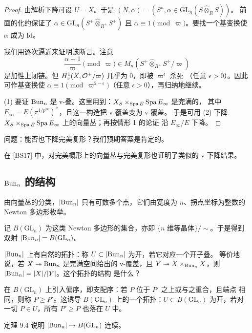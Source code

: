 \begin{proof}
由解析下降可设 $U=X$。于是 $(N,\alpha)=(S^n,\alpha\in\mathrm{GL}_n(S\widehat\otimes_R S))$。
前面的化约保证了 $\alpha\in\mathrm{GL}_n(S^+\widehat\otimes_{R^+}S^+)$ 且
$\alpha\equiv1\pmod\varpi$。要找一个基变换使 $\alpha$ 成为 $\mathrm{Id}$。

我们用逐次逼近来证明该断言。注意
\[
\frac{\alpha-1}{\varpi}\pmod{\varpi}\in M_n(S^+\widehat\otimes_{R^+}S^+/\varpi)
\]
是加性上闭链。但 $H^1_v(X,\mathcal{O}^+/\varpi)$ 几乎为 $0$，即被 $\varpi^\epsilon$ 杀死
（任意 $\epsilon>0$）。因此可作基变换使
$\alpha\equiv1\pmod{\varpi^{2-\epsilon}}$（任意 $\epsilon>0$），再归纳地继续。

(1) 要证 $\mathrm{Bun}_n$ 是 v-叠。这里用到：$X_S\times_{\operatorname{Spa} E}\operatorname{Spa} E_\infty$ 是完满的，
其中 $E_\infty=E(\pi^{1/p^\infty})^\wedge$，且这一构造把 v-覆盖变为 v-覆盖。
于是可用 (2) 下降 $X_S\times_{\operatorname{Spa} E}\operatorname{Spa} E_\infty$ 上的向量丛；再按情形 1 的论证
沿 $E_\infty/E$ 下降。
\end{proof}

问题：能否也下降完美复形？我们预期答案是肯定的。

\begin{remark}
在 [BS17] 中，对完美概形上的向量丛与完美复形也证明了类似的 v-下降结果。
\end{remark}

\subsection{$\mathrm{Bun}_n$ 的结构}

由向量丛的分类，$|\mathrm{Bun}_n|$ 只有可数多个点，它们由宽度为 $n$、拐点坐标为整数的
Newton 多边形枚举。

\begin{center}
\end{center}

记 $B(\mathrm{GL}_n)$ 为这类 Newton 多边形的集合，亦即
$\{n\text{ 维等晶体}\}/\sim$。于是得到双射
$|\mathrm{Bun}_n|=B(\mathrm{GL}_n)$。

$|\mathrm{Bun}_n|$ 上有自然的拓扑：称 $U\subset|\mathrm{Bun}_n|$ 为开，若它对应一个开子叠。
等价地说，若 $X\twoheadrightarrow\mathrm{Bun}_n$ 是完满空间给出的 v-覆盖，且
$Y\twoheadrightarrow X\times_{\mathrm{Bun}_n}X$，则 $|\mathrm{Bun}_n|=|X|/|Y|$。这个拓扑的结构
是什么？

在 $B(\mathrm{GL}_n)$ 上引入偏序，即支配序：若 $P$ 位于 $P'$ 之上或与之重合，且端点
相同，则称 $P\ge P'$。这诱导 $B(\mathrm{GL}_n)$ 上的一个拓扑：$U\subset B(\mathrm{GL}_n)$
为开，若对一切 $P\in U$，所有 $P'\ge P$ 也落在 $U$ 中。

定理 9.4 说明 $|\mathrm{Bun}_n|\to B(\mathrm{GL}_n)$ 连续。

